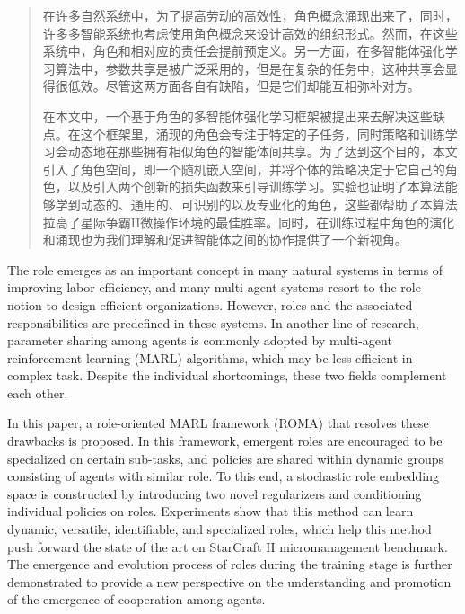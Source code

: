 

\begin{abstract}
   在许多自然系统中，为了提高劳动的高效性，角色概念涌现出来了，同时，许多多智能系统也考虑使用角色概念来设计高效的组织形式。然而，在这些系统中，角色和相对应的责任会提前预定义。另一方面，在多智能体强化学习算法中，参数共享是被广泛采用的，但是在复杂的任务中，这种共享会显得很低效。尽管这两方面各自有缺陷，但是它们却能互相弥补对方。
   
   在本文中，一个基于角色的多智能体强化学习框架被提出来去解决这些缺点。在这个框架里，涌现的角色会专注于特定的子任务，同时策略和训练学习会动态地在那些拥有相似角色的智能体间共享。为了达到这个目的，本文引入了角色空间，即一个随机嵌入空间，并将个体的策略决定于它自己的角色，以及引入两个创新的损失函数来引导训练学习。实验也证明了本算法能够学到动态的、通用的、可识别的以及专业化的角色，这些都帮助了本算法拉高了星际争霸II微操作环境的最佳胜率。同时，在训练过程中角色的演化和涌现也为我们理解和促进智能体之间的协作提供了一个新视角。

\end{abstract}

\begin{enabstract}
  The role emerges as an important concept in many natural systems in terms of improving labor efficiency, and many multi-agent systems resort to the role notion to design efficient organizations. However, roles and the associated responsibilities are predefined in these systems. In another line of research, parameter sharing among agents is commonly adopted by multi-agent reinforcement learning (MARL) algorithms, which may be less efficient in complex task. Despite the individual shortcomings, these two fields complement each other. 
  
  In this paper, a role-oriented MARL framework (ROMA) that resolves these drawbacks is proposed. In this framework, emergent roles are encouraged to be specialized on certain sub-tasks, and policies are shared within dynamic groups consisting of agents with similar role. To this end, a stochastic role embedding space is constructed by introducing two novel regularizers and conditioning individual policies on roles. Experiments show that this method can learn dynamic, versatile, identifiable, and specialized roles, which help this method push forward the state of the art on StarCraft II micromanagement benchmark. The emergence and evolution process of roles during the training stage is further demonstrated to provide a new perspective on the understanding and promotion of the emergence of cooperation among agents.

\end{enabstract}

